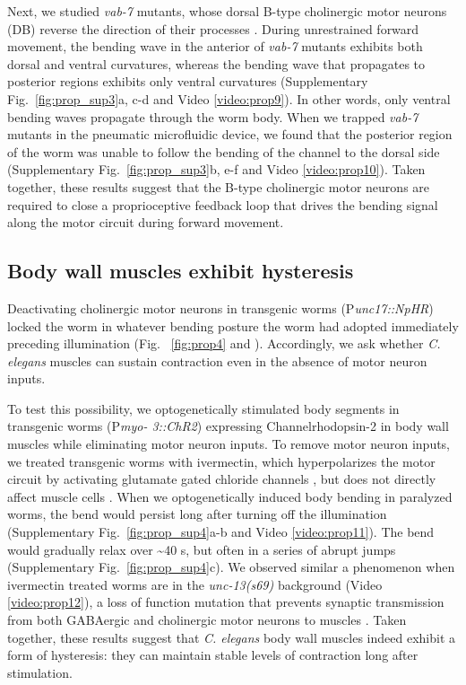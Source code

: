 Next, we studied \textit{vab-7} mutants, whose dorsal B-type cholinergic motor neurons (DB) reverse 
the direction of their processes \citep{esmaeili_c._2002}. During unrestrained forward movement, the bending wave 
in the anterior of \textit{vab-7} mutants exhibits both dorsal and ventral curvatures, whereas the bending 
wave that propagates to posterior regions exhibits only ventral curvatures (Supplementary Fig.~\ref{fig:prop_sup3}a, c-d and Video  \ref{video:prop9}). In other words, only ventral bending waves propagate 
through the worm body. When we trapped \textit{vab-7} mutants in the pneumatic microfluidic device, 
we found that the posterior region of the worm was unable to follow the bending of the channel 
to the dorsal side (Supplementary Fig.~\ref{fig:prop_sup3}b, e-f and Video  \ref{video:prop10}). Taken together, 
these results suggest that the B-type cholinergic motor neurons are required to close a 
proprioceptive feedback loop that drives the bending signal along the motor circuit during 
forward movement. 


\subsection{Body wall muscles exhibit hysteresis}
 
Deactivating cholinergic motor neurons in transgenic worms (P\textit{unc17::NpHR}) locked the worm 
in whatever bending posture the worm had adopted immediately preceding illumination (Fig. ~\ref{fig:prop4} and  \citep{leifer_optogenetic_2011}). Accordingly, we ask 
whether \textit{C. elegans} muscles can sustain contraction even in the absence of motor neuron inputs. 

To test this possibility, we optogenetically stimulated body segments in transgenic worms (P\textit{myo- 3::ChR2}) expressing Channelrhodopsin-2 in body wall muscles while eliminating motor neuron 
inputs. To remove motor neuron inputs, we treated transgenic worms with ivermectin, which 
hyperpolarizes the motor circuit by activating glutamate gated chloride channels \citep{dent_genetics_2000,cully_cloning_1994}, but 
does not directly affect muscle cells \citep{hart_behavior_2006}. When we optogenetically induced body bending in 
paralyzed worms, the bend would persist long after turning off the illumination (Supplementary Fig.~\ref{fig:prop_sup4}a-b and Video  \ref{video:prop11}). The bend would gradually relax over \textasciitilde40 s, but often in 
a series of abrupt jumps (Supplementary Fig.~\ref{fig:prop_sup4}c). We observed similar a phenomenon when 
ivermectin treated worms are in the \textit{unc-13(s69)} background (Video  \ref{video:prop12}), a loss 
of function mutation that prevents synaptic transmission from both GABAergic and cholinergic 
motor neurons to muscles \citep{richmond_unc-13_1999}. Taken together, these results suggest that \textit{C. elegans} body wall 
muscles indeed exhibit a form of hysteresis: they can maintain stable levels of contraction long after stimulation.  

